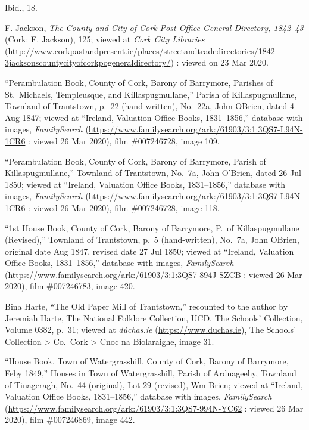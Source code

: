 \begin{thebibliography}{999}
	Ibid., 18.
	
	F. Jackson, \textit{The County and City of Cork Post Office General Directory, 1842--43} (Cork: F. Jackson), 125; viewed at \textit{Cork City Libraries} (\url{http://www.corkpastandpresent.ie/places/streetandtradedirectories/1842-3jacksonscountycityofcorkpogeneraldirectory/}) : viewed on 23 Mar 2020.
	
	``Perambulation Book, County of Cork, Barony of Barrymore, Parishes of St.\ Michaels, Templeusque, and Killaspugmullane,'' Parish of Killaspugmullane, Townland of Trantstown, p.\ 22 (hand-written), No.\ 22a, John OBrien, dated 4 Aug 1847; viewed at ``Ireland, Valuation Office Books, 1831--1856,'' database with images, \textit{FamilySearch} (\url{https://www.familysearch.org/ark:/61903/3:1:3QS7-L94N-1CR6} : viewed 26 Mar 2020), film \#007246728, image 109.
	
	``Perambulation Book, County of Cork, Barony of Barrymore, Parish of Killaspugmullane,'' Townland of Trantstown, No.\ 7a, John O'Brien, dated 26 Jul 1850; viewed at ``Ireland, Valuation Office Books, 1831--1856,'' database with images, \textit{FamilySearch} (\url{https://www.familysearch.org/ark:/61903/3:1:3QS7-L94N-1CR6} : viewed 26 Mar 2020), film \#007246728, image 118.
	
	``1st House Book, County of Cork, Barony of Barrymore, P.\ of Killaspugmullane (Revised),'' Townland of Trantstown, p.\ 5 (hand-written), No.\ 7a, John OBrien, original date Aug 1847, revised date 27 Jul 1850; viewed at ``Ireland, Valuation Office Books, 1831--1856,'' database with images, \textit{FamilySearch} (\url{https://www.familysearch.org/ark:/61903/3:1:3QS7-894J-SZCB} : viewed 26 Mar 2020), film \#007246783, image 420.
		
	Bina Harte, ``The Old Paper Mill of Trantstown,'' recounted to the author by Jeremiah Harte, The National Folklore Collection, UCD, The Schools' Collection, Volume 0382, p.\ 31; viewed at \textit{d\'{u}chas.ie} (\url{https://www.duchas.ie}), The Schools' Collection > Co.\ Cork > Cnoc na Biolaraighe, image 31.
	
	``House Book, Town of Watergrasshill, County of Cork, Barony of Barrymore, Feby 1849,'' Houses in Town of Watergrasshill, Parish of Ardnageehy, Townland of Tinageragh, No.\ 44 (original), Lot 29 (revised), Wm Brien; viewed at ``Ireland, Valuation Office Books, 1831--1856,'' database with images, \textit{FamilySearch} (\url{https://www.familysearch.org/ark:/61903/3:1:3QS7-994N-YC62} : viewed 26 Mar 2020), film \#007246869, image 442.
	

\end{thebibliography}
